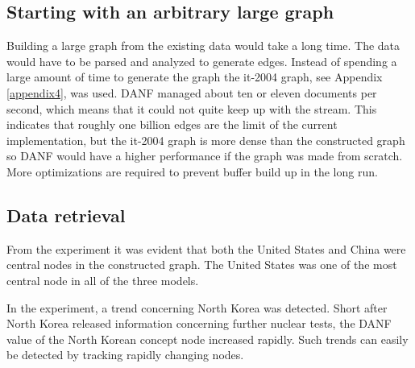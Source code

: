 \subsection{Starting with an arbitrary large graph}

Building a large graph from the existing data would take a long time. The data would have to be parsed and analyzed to generate edges. Instead of spending a large amount of time to generate the graph the it-2004 graph, see Appendix \ref{appendix4}, was used. DANF managed about ten or eleven documents per second, which means that it could not quite keep up with the stream. This indicates that roughly one billion edges are the limit of the current implementation, but the it-2004 graph is more dense than the constructed graph so DANF would have a higher performance if the graph was made from scratch. More optimizations are required to prevent buffer build up in the long run. 

\subsection{Data retrieval}
From the experiment it was evident that both the United States and China were central nodes in the constructed graph. The United States was one of the most central node in all of the three models.

In the experiment, a trend concerning North Korea was detected. Short after North Korea released information concerning further nuclear tests, the DANF value of the North Korean concept node increased rapidly. Such trends can easily be detected by tracking rapidly changing nodes.
